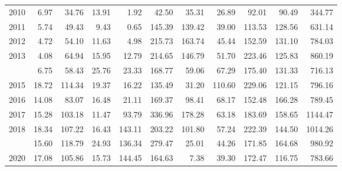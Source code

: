 \begin{longtable}[t]{rrrrrrrrrrr}
2010 & 6.97 & 34.76 & 13.91 & 1.92 & 42.50 & 35.31 & 26.89 & 92.01 & 90.49 & 344.77\\
2011 & 5.74 & 49.43 & 9.43 & 0.65 & 145.39 & 139.42 & 39.00 & 113.53 & 128.56 & 631.14\\
2012 & 4.72 & 54.10 & 11.63 & 4.98 & 215.73 & 163.74 & 45.44 & 152.59 & 131.10 & 784.03\\
2013 & 4.08 & 64.94 & 15.95 & 12.79 & 214.65 & 146.79 & 51.70 & 223.46 & 125.83 & 860.19\\
\addlinespace
2014 & 6.75 & 58.43 & 25.76 & 23.33 & 168.77 & 59.06 & 67.29 & 175.40 & 131.33 & 716.13\\
2015 & 18.72 & 114.34 & 19.37 & 16.22 & 135.49 & 31.20 & 110.60 & 229.06 & 121.15 & 796.16\\
2016 & 14.08 & 83.07 & 16.48 & 21.11 & 169.37 & 98.41 & 68.17 & 152.48 & 166.28 & 789.45\\
2017 & 15.28 & 103.18 & 11.47 & 93.79 & 336.96 & 178.28 & 63.18 & 183.69 & 158.65 & 1144.47\\
2018 & 18.34 & 107.22 & 16.43 & 143.11 & 203.22 & 101.80 & 57.24 & 222.39 & 144.50 & 1014.26\\
\addlinespace
2019 & 15.60 & 118.79 & 24.93 & 136.34 & 279.47 & 25.01 & 44.26 & 171.85 & 164.68 & 980.92\\
2020 & 17.08 & 105.86 & 15.73 & 144.45 & 164.63 & 7.38 & 39.30 & 172.47 & 116.75 & 783.66\\*
\end{longtable}
